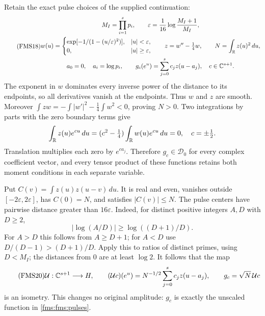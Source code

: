 Retain the exact pulse choices of the supplied continuation:
\begin{equation}\tag{FMS18}\label{fms:fms:pulses}
 \begin{gathered}
 M_I=\prod_{i=1}^s p_i,\qquad
 \varepsilon=\frac1{16}\log\frac{M_I+1}{M_I},\\
 w(u)=
 \begin{cases}
 \exp[-1/(1-(u/\varepsilon)^2)],&|u|<\varepsilon,\\
 0,&|u|\ge\varepsilon,
 \end{cases}
 \qquad z=w''-\tfrac14w,\qquad
 N=\int_\mathbb R z(u)^2\,du,\\
 a_0=0,\quad a_i=\log p_i,\qquad
 g_c(e^u)=\sum_{j=0}^s c_jz(u-a_j),\quad c\in\mathbb C^{s+1}.
 \end{gathered}
\end{equation}
The exponent in $w$ dominates every inverse power of the distance
to its endpoints, so all derivatives vanish at the endpoints.
Thus $w$ and $z$ are smooth. Moreover
$\int zw=-\int|w'|^2-\frac14\int w^2<0$, proving $N>0$.
Two integrations by parts with the zero boundary terms give
\[
 \int_\mathbb R z(u)e^{cu}\,du=(c^2-\tfrac14)
               \int_\mathbb R w(u)e^{cu}\,du=0,\quad c=\pm\tfrac12.
\]
 Translation multiplies each zero by $e^{ca_j}$.
 Therefore $g_c\in\mathcal D_0$ for every complex coefficient
vector, and every tensor product of these functions retains both
moment conditions in each separate variable.

Put $C(v)=\int z(u)z(u-v)\,du$. It is real and even, vanishes
outside $[-2\varepsilon,2\varepsilon]$, has $C(0)=N$, and satisfies
$|C(v)|\le N$. The pulse centers have pairwise distance greater
than $16\varepsilon$. Indeed, for distinct positive integers
$A,D$ with $D\ge2$,
\begin{equation}\tag{FMS19}\label{fms:fms:integergap}
 |\log(A/D)|\ge\log((D+1)/D).
\end{equation}
For $A>D$ this follows from $A\ge D+1$; for $A<D$ use
$D/(D-1)>(D+1)/D$. Apply this to ratios of distinct primes,
using $D<M_I$; the distances from $0$ are at least $\log2$.
It follows that the map
\begin{equation}\tag{FMS20}\label{fms:fms:embedding}
 \mathcal U:\mathbb C^{s+1}\longrightarrow H,\qquad
 (\mathcal Uc)(e^u)=N^{-1/2}\sum_{j=0}^s c_jz(u-a_j),
 \qquad g_c=\sqrt N\,\mathcal Uc
\end{equation}
is an isometry. This changes no original amplitude:
$g_c$ is exactly the unscaled function in \eqref{fms:fms:pulses}.

